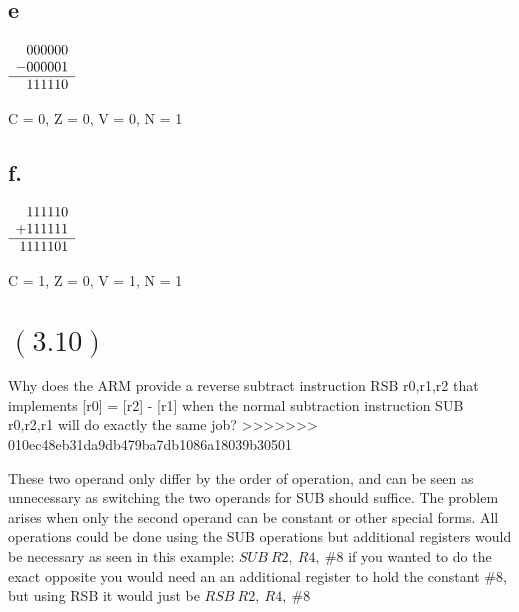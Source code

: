 \documentclass[letterpaper,12pt,titlepage]{article}
\begin{document}
\subsection*{e}

$\begin{array}[t]{r}
   000000 \\
  -000001 \\\hline
   111110 \\
\end{array}$

\begin{mdframed}[style=MyFrame]
C = 0,
Z = 0,
V = 0,
N = 1
\end{mdframed}

\subsection*{f.}

$\begin{array}[t]{r}
   111110 \\
  +111111 \\\hline
  1111101 \\
\end{array}$

\begin{mdframed}[style=MyFrame]
C = 1,
Z = 0,
V = 1,
N = 1
\end{mdframed}

\section*{$(3.10)$} Why does the ARM provide a reverse subtract instruction RSB r0,r1,r2 that implements [r0] = [r2] - [r1] when the normal subtraction instruction SUB r0,r2,r1 will do exactly the same job? \newline
>>>>>>> 010ec48eb31da9db479ba7db1086a18039b30501

\begin{mdframed}[style=MyFrame]
These two operand only differ by the order of operation, and can be seen as unnecessary as switching the two operands for SUB should suffice. The problem arises when only the second operand can be constant or other special forms. All operations could be done using the SUB operations but additional registers would be necessary as seen  in this example: $SUB~R2,~R4,~\#8$ if you wanted to do the exact opposite you would need an an additional register to hold the constant $\#8$, but using RSB it would just be $RSB~R2,~R4,~\#8$
\end{mdframed}
\end{document}
